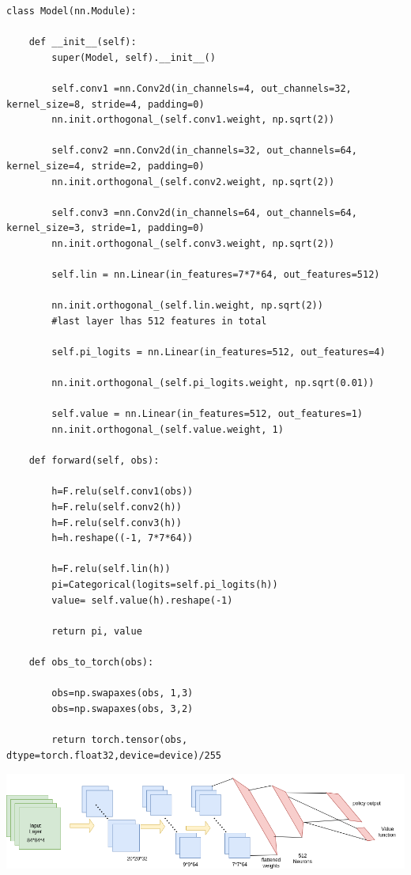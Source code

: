 \documentclass[12pt]{extarticle}
\begin{document}
\begin{lstlisting}
class Model(nn.Module):

	def __init__(self):
		super(Model, self).__init__()

		self.conv1 =nn.Conv2d(in_channels=4, out_channels=32, kernel_size=8, stride=4, padding=0)
		nn.init.orthogonal_(self.conv1.weight, np.sqrt(2))

		self.conv2 =nn.Conv2d(in_channels=32, out_channels=64, kernel_size=4, stride=2, padding=0)
		nn.init.orthogonal_(self.conv2.weight, np.sqrt(2))

		self.conv3 =nn.Conv2d(in_channels=64, out_channels=64, kernel_size=3, stride=1, padding=0)
		nn.init.orthogonal_(self.conv3.weight, np.sqrt(2))		

		self.lin = nn.Linear(in_features=7*7*64, out_features=512)

		nn.init.orthogonal_(self.lin.weight, np.sqrt(2))
		#last layer lhas 512 features in total 

		self.pi_logits = nn.Linear(in_features=512, out_features=4)

		nn.init.orthogonal_(self.pi_logits.weight, np.sqrt(0.01))

		self.value = nn.Linear(in_features=512, out_features=1)
		nn.init.orthogonal_(self.value.weight, 1)

	def forward(self, obs):
		
		h=F.relu(self.conv1(obs))
		h=F.relu(self.conv2(h))
		h=F.relu(self.conv3(h))
		h=h.reshape((-1, 7*7*64))
		
		h=F.relu(self.lin(h))
		pi=Categorical(logits=self.pi_logits(h))
		value= self.value(h).reshape(-1)

		return pi, value

	def obs_to_torch(obs):

		obs=np.swapaxes(obs, 1,3)
		obs=np.swapaxes(obs, 3,2)

		return torch.tensor(obs, dtype=torch.float32,device=device)/255

\end{lstlisting}

\includegraphics[scale=0.5]{Network}\\
\end{document}
